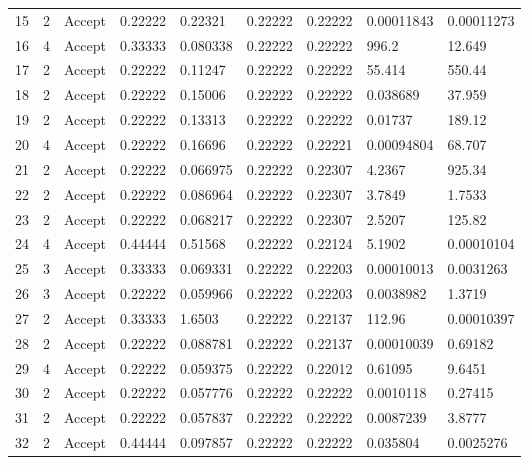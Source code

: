 \documentclass[5p]{elsarticle}
\begin{document}
\begin{frontmatter}
\begin{table}[h!]
\begin{center}
\begin{tabular}{l | l | l|l|l|l|l|l|l}
15 &       2 & Accept &     0.22222 &     0.22321 &     0.22222 &     0.22222 &   0.00011843 &   0.00011273 \\
16 &       4 & Accept &     0.33333 &    0.080338 &     0.22222 &     0.22222 &        996.2 &       12.649 \\
17 &       2 & Accept &     0.22222 &     0.11247 &     0.22222 &     0.22222 &       55.414 &       550.44 \\
18 &       2 & Accept &     0.22222 &     0.15006 &     0.22222 &     0.22222 &     0.038689 &       37.959 \\
19 &       2 & Accept &     0.22222 &     0.13313 &     0.22222 &     0.22222 &      0.01737 &       189.12 \\
20 &       4 & Accept &     0.22222 &     0.16696 &     0.22222 &     0.22221 &   0.00094804 &       68.707 \\
21 &       2 & Accept &     0.22222 &    0.066975 &     0.22222 &     0.22307 &       4.2367 &       925.34 \\
22 &       2 & Accept &     0.22222 &    0.086964 &     0.22222 &     0.22307 &       3.7849 &       1.7533 \\
23 &       2 & Accept &     0.22222 &    0.068217 &     0.22222 &     0.22307 &       2.5207 &       125.82 \\
24 &       4 & Accept &     0.44444 &     0.51568 &     0.22222 &     0.22124 &       5.1902 &   0.00010104 \\
25 &       3 & Accept &     0.33333 &    0.069331 &     0.22222 &     0.22203 &   0.00010013 &    0.0031263 \\
26 &       3 & Accept &     0.22222 &    0.059966 &     0.22222 &     0.22203 &    0.0038982 &       1.3719 \\
27 &       2 & Accept &     0.33333 &      1.6503 &     0.22222 &     0.22137 &       112.96 &   0.00010397 \\
28 &       2 & Accept &     0.22222 &    0.088781 &     0.22222 &     0.22137 &   0.00010039 &      0.69182 \\
29 &       4 & Accept &     0.22222 &    0.059375 &     0.22222 &     0.22012 &      0.61095 &       9.6451 \\
30 &       2 & Accept &     0.22222 &    0.057776 &     0.22222 &     0.22222 &    0.0010118 &      0.27415 \\
31 &       2 & Accept &     0.22222 &    0.057837 &     0.22222 &     0.22222 &    0.0087239 &       3.8777 \\
32 &       2 & Accept &     0.44444 &    0.097857 &     0.22222 &     0.22222 &     0.035804 &    0.0025276 
\\
\hline
    \end{tabular}
  \end{center}
\end{table}



\end{frontmatter}
\end{document}
